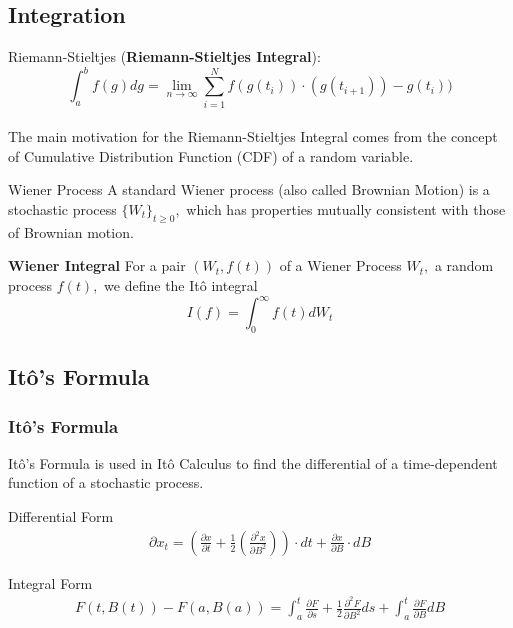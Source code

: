 \subsection{Integration}
\begin{frame}{Riemann-Stieltjes}
(\textbf{Riemann-Stieltjes Integral}): 
$$\displaystyle \int_{a}^{b} f(g)dg= \underset{n \to \infty}{\lim} \sum_{i=1}^{N} f(g(t_i)) \cdot (g(t_{i+1}))- g(t_i))$$\\

The main motivation for the Riemann-Stieltjes Integral comes from the concept of Cumulative Distribution Function (CDF) of a random variable. 
\end{frame}

\begin{frame}{Wiener Process}
A standard Wiener process (also called Brownian Motion) is a stochastic process $\{W_t\}_{t \geq 0},$ which has properties mutually consistent with those of Brownian motion.

\vfill

\textbf{Wiener Integral} For a pair $(W_t,f(t))$ of a Wiener Process $W_t,$ a random process $f(t),$ we define the It\^o integral 
	$$I(f)=\int_0^{\infty} f(t)dW_t$$
\end{frame}



\subsection{It\^o's Formula}

\begin{frame}
\frametitle{It\^o's Formula}
It\^o's Formula is used in It\^o Calculus to find the differential of a time-dependent function of a stochastic process.
\vfill

		 \begin{block}{Differential Form}
      \begin{align*}
				\displaystyle \partial x_t =\left(\frac{\partial x}{\partial t} + \frac{1}{2} \left(\frac{\partial ^2 x}{\partial B ^2}\right)\right) \cdot  dt + \frac{\partial x}{\partial B} \cdot dB 
			\end{align*}
    \end{block}
		
\vfill

		\begin{block}{Integral Form}
      \begin{align*}
				\displaystyle F(t, B(t))-F(a,B(a))=
 \int_{a}^{t} \frac{\partial F}{\partial s} + \frac{1}{2} \frac{\partial^2 F}{\partial B^2}ds+
 \int_a^t \frac{\partial F}{\partial B} dB
			\end{align*}
    \end{block}

\vfill
\end{frame}

